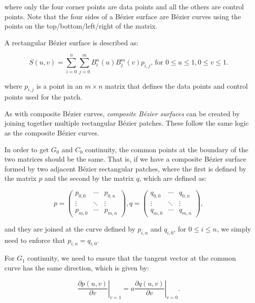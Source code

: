 where only the four corner points are data points and all the others are control points.
Note that the four sides of a B\'ezier surface are B\'ezier curves using the points on the top/bottom/left/right of the matrix.

A rectangular B\'ezier surface is described as:

\begin{equation}
\label{eq:bezierrectangle}
S(u, v) = \sum_{i=0}^n \sum_{j=0}^m B^n_i(u) B^m_j(v) p_{i,j}\text{, for }0 \leq u \leq 1, 0 \leq v \leq 1.
\end{equation}

where \(p_{i,j}\) is a point in an \(m \times n\) matrix that defines the data points and control points used for the patch.

As with composite B\'ezier curves, \emph{composite B\'ezier surfaces} can be created by joining together multiple rectangular B\'ezier patches.
These follow the same logic as the composite B\'ezier curves.

In order to get \(G_0\) and \(C_0\) continuity, the common points at the boundary of the two matrices should be the same.
That is, if we have a composite B\'ezier surface formed by two adjacent B\'ezier rectangular patches, where the first is defined by the matrix \(p\) and the second by the matrix \(q\), which are defined as:

\begin{equation}
p = \left(\begin{array}{ccc}
p_{0,0} & \cdots & p_{0,n} \\
\vdots & \ddots & \vdots \\
p_{m,0} & \cdots & p_{m,n} 
\end{array}\right),
q = \left(\begin{array}{ccc}
q_{0,0} & \cdots & q_{0,n} \\
\vdots & \ddots & \vdots \\
q_{m,0} & \cdots & q_{m,n} 
\end{array}\right),
\end{equation}

and they are joined at the curve defined by \(p_{i,n}\) and \(q_{i,0}\), for \(0 \leq i \leq n\), we simply need to enforce that \(p_{i,n} = q_{i, 0}\).

For \(G_1\) continuity, we need to ensure that the tangent vector at the common curve has the same direction, which is given by:

\begin{equation}
\left. \frac{\partial p(u,v)}{\partial v} \right|_{v=1} = a \left. \frac{\partial q(u,v)}{\partial v} \right|_{v=0}.
\end{equation}

